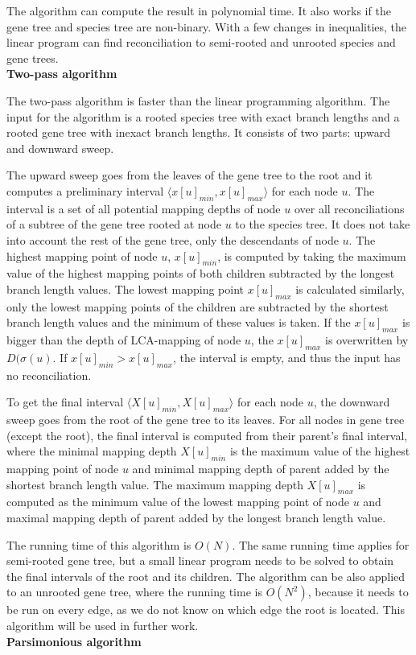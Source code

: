 The algorithm can compute the result in polynomial time. It also works if the gene tree and species tree are non-binary. With a few changes in inequalities, the linear program can find reconciliation to semi-rooted and unrooted species and gene trees.\\
\textbf{Two-pass algorithm} \label{two-pass_algorithm}

The two-pass algorithm is faster than the linear programming algorithm. The input for the algorithm is a rooted species tree with exact branch lengths and a rooted gene tree with inexact branch lengths. It consists of two parts: upward and downward sweep. 

The upward sweep goes from the leaves of the gene tree to the root and it computes a preliminary interval $\langle x[u]_{min}, x[u]_{max} \rangle$ for each node $u$. The interval is a set of all potential mapping depths of node $u$ over all reconciliations of a subtree of the gene tree rooted at node $u$ to the species tree. It does not take into account the rest of the gene tree, only the descendants of node $u$. The highest mapping point of node $u$, $x[u]_{min}$, is computed by taking the maximum value of the highest mapping points of both children subtracted by the longest branch length values. The lowest mapping point $x[u]_{max}$ is calculated similarly, only the lowest mapping points of the children are subtracted by the shortest branch length values and the minimum of these values is taken. If the $x[u]_{max}$ is bigger than the depth of LCA-mapping of node $u$, the $x[u]_{max}$ is overwritten by $D(\sigma(u)$. If $x[u]_{min} > x[u]_{max}$, the interval is empty, and thus the input has no reconciliation.

To get the final interval $\langle X[u]_{min}, X[u]_{max} \rangle$ for each node $u$, the downward sweep goes from the root of the gene tree to its leaves.
For all nodes in gene tree (except the root), the final interval is computed from their parent's final interval, where the minimal mapping depth $X[u]_{min}$ is the maximum value of the highest mapping point of node $u$ and minimal mapping depth of parent added by the shortest branch length value. The maximum mapping depth $X[u]_{max}$ is computed as the minimum value of the lowest mapping point of node $u$ and maximal mapping depth of parent added by the longest branch length value.

The running time of this algorithm is $O(N)$. The same running time applies for semi-rooted gene tree, but a small linear program needs to be solved to obtain the final intervals of the root and its children. The algorithm can be also applied to an unrooted gene tree, where the running time is $O(N^2)$, because it needs to be run on every edge, as we do not know on which edge the root is located. This algorithm will be used in further work.\\
\textbf{Parsimonious algorithm}

